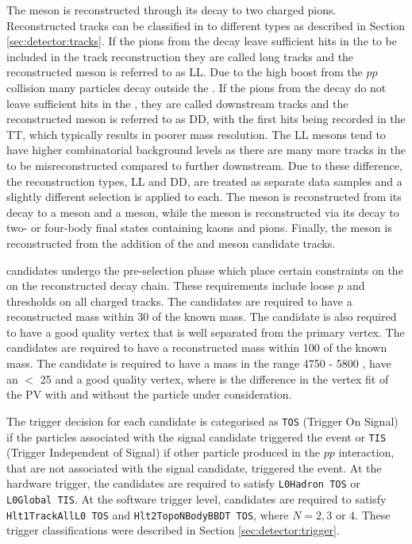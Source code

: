 The \KS meson is reconstructed through its decay to two charged pions. Reconstructed tracks can be classified in to different types as described in Section \ref{sec:detector:tracks}. If the pions from the \KS decay leave sufficient hits in the \velo to be included in the track reconstruction they are called long tracks and the reconstructed \KS meson is referred to as LL. Due to the high boost from the $pp$ collision many \KS particles decay outside the \velo. If the pions from the \KS decay do not leave sufficient hits in the \velo, they are called downstream tracks and the reconstructed \KS meson is referred to as DD, with the first hits being recorded in the TT, which typically results in poorer mass resolution. The LL \KS mesons tend to have higher combinatorial background levels as there are many more tracks in the \velo to be misreconstructed compared to further downstream. Due to these difference, the \KS reconstruction types, LL and DD, are treated as separate data samples and a slightly different selection is applied to each. The \Kstarm meson is reconstructed from its decay to a \KS meson and a \pim meson, while the \Dz meson is reconstructed via its decay to two- or four-body final states containing kaons and pions. Finally, the \Bm meson is reconstructed from the addition of the \Dz and \Kstarm meson candidate tracks.

\decay{\Bpm}{\D\Kstarpm} candidates undergo the pre-selection phase which place certain constraints on the on the reconstructed decay chain. These requirements include loose $p$ and \pt thresholds on all charged tracks. The \KS candidates are required to have a reconstructed mass within 30 \mevcc of the known mass. The \KS candidate is also required to have a good quality vertex that is well separated from the primary vertex. The \Dz candidates are required to have a reconstructed mass within 100 \mevcc of the known mass. The \Bm candidate is required to have a mass in the range 4750 - 5800 \mevcc, have an \chisqip $<$ 25 and a good quality vertex, where \chisqip is the difference in the vertex fit \chisq of the PV with and without the particle under consideration.

The trigger decision for each candidate is categorised as {\tt TOS} (Trigger On Signal) if the particles associated with the signal candidate triggered the event or {\tt TIS} (Trigger Independent of Signal) if other particle produced in the $pp$ interaction, that are not associated with the signal candidate, triggered the event. At the hardware trigger, the \Bm candidates are required to satisfy {\tt L0Hadron TOS} or {\tt L0Global TIS}. At the software trigger level, \Bm candidates are required to satisfy {\tt Hlt1TrackAllL0 TOS} and {\tt Hlt2TopoNBodyBBDT TOS}, where $N = 2,3 \text{ or } 4$. These trigger classifications were described in Section \ref{sec:detector:trigger}.

